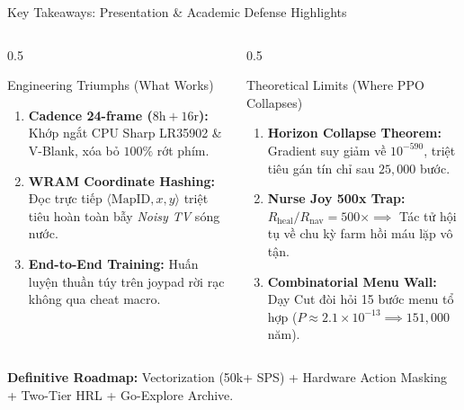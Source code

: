 \documentclass[aspectratio=169, 10pt]{beamer}
\begin{document}
\begin{frame}{Key Takeaways: Presentation \& Academic Defense Highlights}
\begin{columns}[t]
    \begin{column}{0.5\textwidth}
        \begin{exampleblock}{Engineering Triumphs (What Works)}
            \begin{enumerate}\footnotesize
                \item \textbf{Cadence 24-frame ($8\text{h} + 16\text{r}$):} Khớp ngắt CPU Sharp LR35902 \& V-Blank, xóa bỏ $100\%$ rớt phím.
                \item \textbf{WRAM Coordinate Hashing:} Đọc trực tiếp $\langle \text{MapID}, x, y \rangle$ triệt tiêu hoàn toàn bẫy \textit{Noisy TV} sóng nước.
                \item \textbf{End-to-End Training:} Huấn luyện thuần túy trên joypad rời rạc không qua cheat macro.
            \end{enumerate}
        \end{exampleblock}
    \end{column}
    \begin{column}{0.5\textwidth}
        \begin{alertblock}{Theoretical Limits (Where PPO Collapses)}
            \begin{enumerate}\footnotesize
                \item \textbf{Horizon Collapse Theorem:} Gradient suy giảm về $10^{-590}$, triệt tiêu gán tín chỉ sau $25{,}000$ bước.
                \item \textbf{Nurse Joy 500x Trap:} $R_{\text{heal}}/R_{\text{nav}} = 500\times \implies$ Tác tử hội tụ về chu kỳ farm hồi máu lặp vô tận.
                \item \textbf{Combinatorial Menu Wall:} Dạy Cut đòi hỏi 15 bước menu tổ hợp ($P \approx 2.1 \times 10^{-13} \implies 151{,}000$ năm).
            \end{enumerate}
        \end{alertblock}
    \end{column}
\end{columns}

\vspace{0.2cm}
\centering
\textbf{Definitive Roadmap:} Vectorization (50k+ SPS) + Hardware Action Masking + Two-Tier HRL + Go-Explore Archive.
\end{frame}
\end{document}

